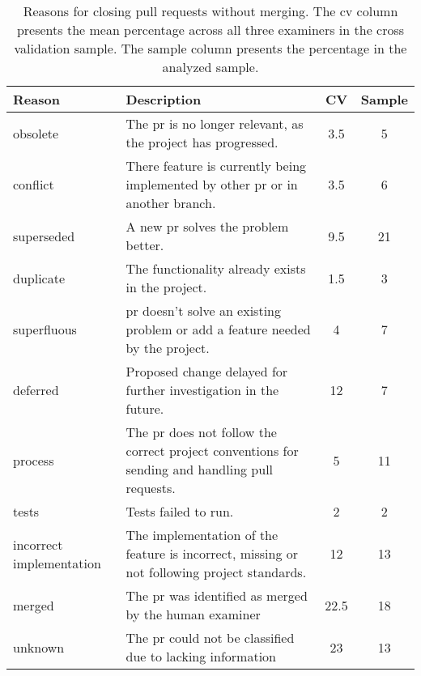 \documentclass{sig-alternate}
\begin{document}
\begin{table}[t]
  \begin{small}
  \centering
  \begin{tabular}{p{6em}p{14em}cc}
    \hline
    \textbf{Reason} & \textbf{Description} & \textbf{CV} &
    \textbf{Sample}
\\
    \hline
    \textsf{obsolete} &	The {\sc pr} is no longer relevant, as the project
    has progressed. & 3.5 & 5\\

    \textsf{conflict} &	There feature is currently being implemented by other
    {\sc pr} or in another branch. &  3.5 & 6\\

    \textsf{superseded} &	A new {\sc pr} solves the problem better. & 9.5 & 21\\

    \textsf{duplicate} & The functionality already exists in the project. & 1.5 & 3 \\

    \textsf{superfluous} & {\sc pr} doesn't solve an existing problem or add a
    feature needed by the project. & 4 & 7\\

    \textsf{deferred} & Proposed change delayed for further investigation in the
    future. & 12 & 7\\

    \textsf{process} & The {\sc pr} does not follow the correct project
    conventions for sending and handling pull requests. & 5 & 11\\
    
    \textsf{tests} & Tests failed to run. & 2 & 2\\

    \textsf{incorrect implementation} &	The implementation of the feature is
    incorrect, missing or not following project standards. & 12 & 13\\

    \hline 
    \textsf{merged} & The {\sc pr} was identified as merged by the human
    examiner & 22.5 & 18\\

    \textsf{unknown} & The {\sc pr} could not be classified due to lacking
    information & 23 & 13 \\

    \hline
  \end{tabular}
\end{small}
\caption{Reasons for closing pull requests without merging. The {\sc cv} column
presents the mean percentage across all three examiners in the cross validation sample. The sample column presents the percentage in the analyzed sample.}
\label{tab:unmerged}
\end{table}
\end{document}
